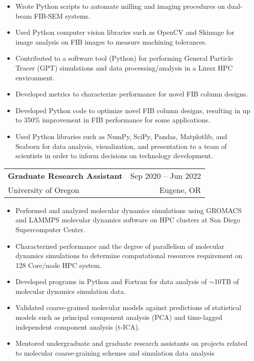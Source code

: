 \documentclass[letterpaper,10.8pt]{article}
\makeatletter
\newcommand{\resumeSubheading}[4]{
  \vspace{-1pt} \item
    \begin{tabular*}{0.97\textwidth}{l@{\extracolsep{\fill}}r}
      \textbf{#1} & #2 \\
      #3  &  #4 \\
    \end{tabular*}\vspace{-5pt}
}
\makeatother
\begin{document}
    \begin{itemize}[label={$\diamond$}]
    \itemsep0em %
    
\item {Wrote Python scripts to automate milling and imaging procedures on dual-beam FIB-SEM systems.}
	
	\item {Used Python computer vision libraries such as OpenCV and Skimage for image analysis on FIB images to measure machining tolerances.}
	
	\item {Contributed to a software tool (Python) for performing General Particle Tracer (GPT) simulations and data processing/analysis in a Linux HPC environment.}
	
	\item{Developed metrics to characterize performance for novel FIB column designs.}
	
	\item {Developed Python code to optimize novel FIB column designs, resulting in up to 350\% improvement in FIB performance for some applications.}
	
	\item {Used Python libraries such as NumPy, SciPy, Pandas, Matplotlib, and Seaborn for data analysis, visualization, and presentation to a team of scientists in order to inform decisions on technology development.}
	
	\end{itemize} %
      
    \resumeSubheading
		{Graduate Research Assistant}{Sep 2020 – Jun 2022}
		{University of Oregon}{Eugene, OR}
	\begin{itemize}[label={$\diamond$}]
	\itemsep0em  %
	
	\item{Performed and analyzed molecular dynamics simulations using GROMACS and LAMMPS molecular dynamics software on HPC clusters at San Diego Supercomputer Center.}
	
	\item{Characterized performance and the degree of parallelism of molecular dynamics simulations to determine computational resources requirement on 128 Core/node HPC system.}

	\item{Developed programs in Python and Fortran for data analysis of $\sim$10TB of molecular dynamics simulation data.}
	
	\item{Validated coarse-grained molecular models against predictions of statistical models such as principal component analysis (PCA) and time-lagged independent component analysis (t-ICA).}
	
	\item{Mentored undergraduate and graduate research assistants on projects related
to molecular coarse-graining schemes and simulation data analysis}
	
	\end{itemize} %
\end{document}
